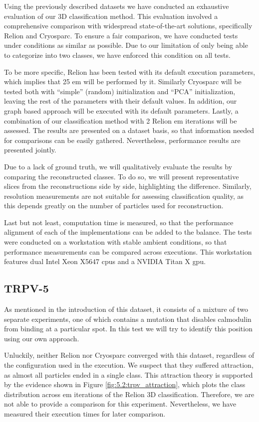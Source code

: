 \documentclass[../main.tex]{subfiles}
\begin{document}
Using the previously described datasets we have conducted an exhaustive evaluation of our 3D classification method. This evaluation involved a comprehensive comparison with widespread state-of-the-art solutions, specifically Relion\cite{scheres2021} and Cryosparc\cite{cryosparc}. To ensure a fair comparison, we have conducted tests under conditions as similar as possible. Due to our limitation of only being able to categorize into two classes, we have enforced this condition on all tests.


To be more specific, Relion has been tested with its default execution parameters, which implies that 25 \gls{em} will be performed by it. Similarly Cryosparc will be tested both with ``simple'' (random) initialization and ``PCA'' initialization, leaving the rest of the parameters with their default values. In addition, our graph based approach will be executed with its default parameters. Lastly, a combination of our classification method with 2 Relion \gls{em} iterations will be assessed. The results are presented on a dataset basis, so that information needed for comparisons can be easily gathered. Nevertheless, performance results are presented jointly.

Due to a lack of ground truth, we will qualitatively evaluate the results by comparing the reconstructed classes. To do so, we will present representative slices from the reconstructions side by side, highlighting the difference. Similarly, resolution measurements are not suitable for assessing classification quality, as this depends greatly on the number of particles used for reconstruction.

Last but not least, computation time is measured, so that the performance alignment of each of the implementations can be added to the balance. The tests were conducted on a workstation with stable ambient conditions, so that performance measurements can be compared across executions. This workstation features dual Intel Xeon X5647 \glspl{cpu} and a NVIDIA Titan X \gls{gpu}.

\subsection{TRPV-5}
As mentioned in the introduction of this dataset, it consists of a mixture of two separate experiments, one of which contains a mutation that disables calmodulin from binding at a particular spot. In this test we will try to identify this position using our own approach.

Unluckily, neither Relion nor Cryosparc converged with this dataset, regardless of the configuration used in the execution. We suspect that they suffered attraction, as almost all particles ended in a single class. This attraction theory is supported by the evidence shown in Figure \ref{fig:5.2:trpv_attraction}, which plots the class distribution across \gls{em} iterations of the Relion 3D classification. Therefore, we are not able to provide a comparison for this experiment. Nevertheless, we have measured their execution times for later comparison. 
\end{document}
